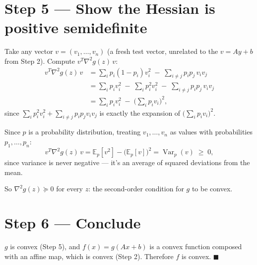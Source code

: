 \documentclass[11pt]{article}
\begin{document}
\section*{Step 5 --- Show the Hessian is positive semidefinite}

Take any vector $v=(v_1,\dots,v_n)$ (a fresh test vector, unrelated to the $v=Ay+b$ from Step 2). Compute $v^T\nabla^2g(z)\,v$:
\begin{align*}
v^T\nabla^2g(z)\,v
&= \sum_i p_i(1-p_i)v_i^2 \;-\; \sum_{i\ne j} p_ip_j\,v_iv_j \\
&= \sum_i p_iv_i^2 \;-\; \sum_i p_i^2v_i^2 \;-\; \sum_{i\ne j}p_ip_j\,v_iv_j \\
&= \sum_i p_iv_i^2 \;-\; \Big(\sum_i p_iv_i\Big)^2,
\end{align*}
since $\sum_i p_i^2v_i^2 + \sum_{i\ne j}p_ip_jv_iv_j$ is exactly the expansion of $\big(\sum_i p_iv_i\big)^2$.

Since $p$ is a probability distribution, treating $v_1,\dots,v_n$ as values with probabilities $p_1,\dots,p_n$:
\[
v^T\nabla^2g(z)\,v = \mathbb E_p[v^2] - \big(\mathbb E_p[v]\big)^2 = \operatorname{Var}_p(v) \;\ge\; 0,
\]
since variance is never negative --- it's an average of squared deviations from the mean.

So $\nabla^2g(z)\succeq 0$ for every $z$: the second-order condition for $g$ to be convex.

\section*{Step 6 --- Conclude}

$g$ is convex (Step 5), and $f(x)=g(Ax+b)$ is a convex function composed with an affine map, which is convex (Step 2). Therefore $f$ is convex. $\blacksquare$
\end{document}
